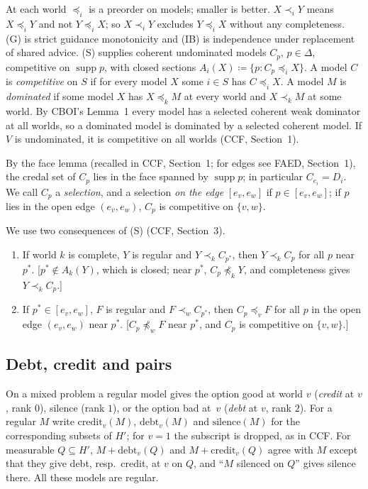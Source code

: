 \documentclass[11pt]{article}
\theoremstyle{definition}\newtheorem{definition}[theorem]{Definition}
\theoremstyle{remark}\newtheorem{remark}[theorem]{Remark}
\newcommand{\supp}{\operatorname{supp}}
\newcommand{\debt}{\mathrm{debt}}
\newcommand{\cred}{\mathrm{credit}}
\newcommand{\sil}{\mathrm{silence}}
\begin{document}
At each world $\preceq_i$ is a preorder on models; smaller is better.
$X\prec_iY$ means $X\preceq_iY$ and not $Y\preceq_iX$; so $X\prec_iY$
excludes $Y\preceq_iX$ without any completeness. (G) is strict guidance
monotonicity and (IB) is independence under replacement of shared advice.
(S) supplies coherent undominated models $C_p$, $p\in\Delta$, competitive on
$\supp p$, with closed sections $A_i(X)\coloneqq\{p:C_p\preceq_iX\}$. A model
$C$ is \emph{competitive} on $S$ if for every model $X$ some $i\in S$ has
$C\preceq_iX$. A model $M$ is \emph{dominated} if some model $X$ has
$X\preceq_kM$ at every world and $X\prec_kM$ at some world. By CBOI's
Lemma~1 every model has a selected coherent weak dominator at all worlds, so
a dominated model is dominated by a selected coherent model. If $V$ is
undominated, it is competitive on all worlds (CCF, Section~1).

By the face lemma (recalled in CCF, Section~1; for edges see
FAED, Section~1), the credal set of $C_p$ lies in the face spanned by
$\supp p$; in particular $C_{e_i}=D_i$. We call $C_p$ a \emph{selection}, and
a selection \emph{on the edge} $[e_v,e_w]$ if $p\in[e_v,e_w]$; if $p$ lies in
the open edge $(e_v,e_w)$, $C_p$ is competitive on $\{v,w\}$.

We use two consequences of (S) (CCF, Section~3).
\begin{enumerate}[label=(T\arabic*),leftmargin=*,itemsep=2pt]
\item If world $k$ is complete, $Y$ is regular and $Y\prec_kC_{p^*}$, then
$Y\prec_kC_p$ for all $p$ near $p^*$. [$p^*\notin A_k(Y)$, which is closed;
near $p^*$, $C_p\not\preceq_kY$, and completeness gives $Y\prec_kC_p$.]
\item If $p^*\in[e_v,e_w]$, $F$ is regular and $F\prec_wC_{p^*}$, then
$C_p\preceq_vF$ for all $p$ in the open edge $(e_v,e_w)$ near $p^*$.
[$C_p\not\preceq_wF$ near $p^*$, and $C_p$ is competitive on $\{v,w\}$.]
\end{enumerate}

\subsection{Debt, credit and pairs}\label{sec:pairs}

On a mixed problem a regular model gives the option good at world $v$
(\emph{credit} at $v$, rank $0$), silence (rank $1$), or the option bad
at~$v$ (\emph{debt} at $v$, rank $2$). For a regular $M$ write
$\cred_v(M)$, $\debt_v(M)$ and $\sil(M)$ for the corresponding subsets of
$H'$; for $v=1$ the subscript is dropped, as in CCF. For measurable
$Q\subseteq H'$, $M+\debt_v(Q)$ and $M+\cred_v(Q)$ agree with $M$ except that
they give debt, resp.\ credit, at $v$ on $Q$, and ``$M$ silenced on $Q$''
gives silence there. All these models are regular.
\end{document}
